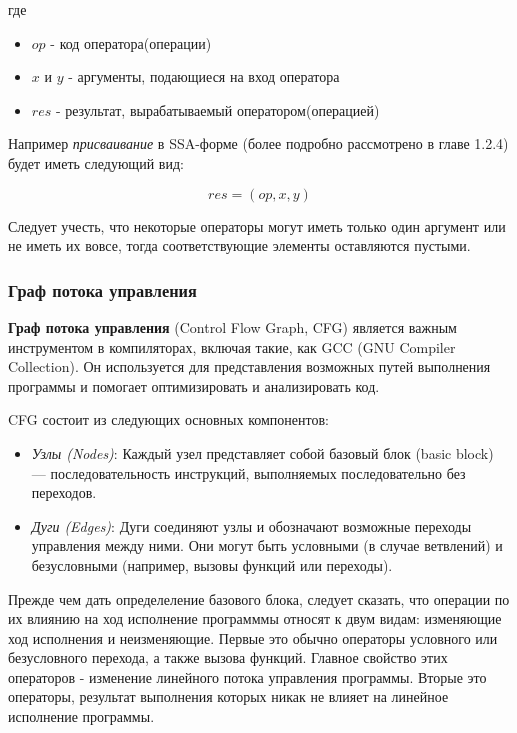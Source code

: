 где
\begin{itemize}
    \item $op$ - код оператора(операции)
    \item $x$ и $y$ - аргументы, подающиеся на вход оператора
    \item $res$ - результат, вырабатываемый оператором(операцией)
\end{itemize}

Например \textit{присваивание} в SSA-форме (более подробно рассмотрено в главе 1.2.4) будет иметь следующий вид:

\begin{equation}
    res = (op, x, y)
    \label{formula assign}
\end{equation}

Следует учесть, что некоторые операторы могут иметь только один аргумент или не иметь их вовсе, тогда соответствующие элементы оставляются пустыми.

\subsubsection{Граф потока управления}

\textbf{Граф потока управления} (Control Flow Graph, CFG) является важным инструментом в компиляторах, включая такие, как GCC (GNU Compiler Collection). Он используется для представления возможных путей выполнения программы и помогает оптимизировать и анализировать код.

CFG состоит из следующих основных компонентов:

\begin{itemize}
    \item \textit{Узлы (Nodes)}: Каждый узел представляет собой базовый блок (basic block) — последовательность инструкций, выполняемых последовательно без переходов.
    \item \textit{Дуги (Edges)}: Дуги соединяют узлы и обозначают возможные переходы управления между ними. Они могут быть условными (в случае ветвлений) и безусловными (например, вызовы функций или переходы).
\end{itemize}

Прежде чем дать определеление базового блока, следует сказать, что операции по их влиянию на ход исполнение программмы относят к двум видам: изменяющие ход исполнения и неизменяющие. Первые это обычно операторы условного или безусловного перехода, а также вызова функций. Главное свойство этих операторов - изменение линейного потока управления программы. Вторые это операторы, результат выполнения которых никак не влияет на линейное исполнение программы.

